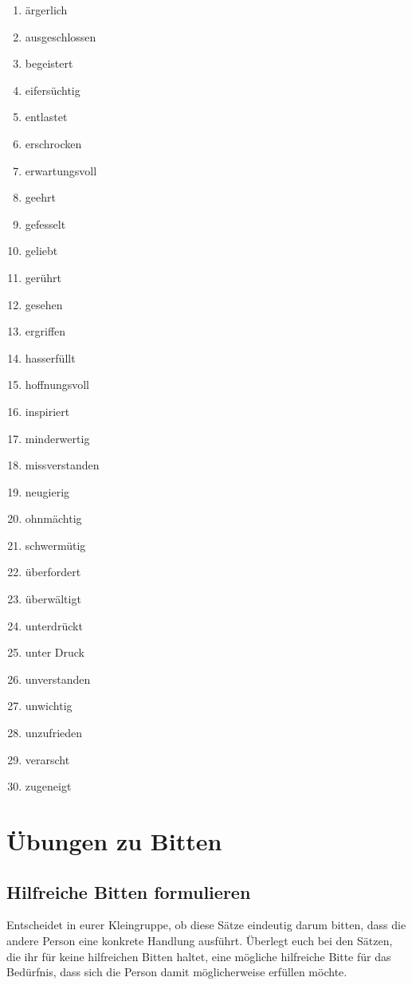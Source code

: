 \begin{enumerate}
    \item ärgerlich
    \item ausgeschlossen
    \item begeistert
    \item eifersüchtig
    \item entlastet
    \item erschrocken
    \item erwartungsvoll
    \item geehrt
    \item gefesselt
    \item geliebt
    \item gerührt
    \item gesehen
    \item ergriffen
    \item hasserfüllt
    \item hoffnungsvoll
    \item inspiriert
    \item minderwertig
    \item missverstanden
    \item neugierig
    \item ohnmächtig
    \item schwermütig
    \item überfordert
    \item überwältigt
    \item unterdrückt
    \item unter Druck
    \item unverstanden
    \item unwichtig
    \item unzufrieden
    \item verarscht
    \item zugeneigt
\end{enumerate}


\section{Übungen zu Bitten}

\subsection{Hilfreiche Bitten formulieren}

Entscheidet in eurer Kleingruppe, ob diese Sätze eindeutig darum bitten, dass die andere Person eine konkrete Handlung ausführt. Überlegt euch bei den Sätzen, die ihr für keine hilfreichen Bitten haltet, eine mögliche hilfreiche Bitte für das Bedürfnis, dass sich die Person damit möglicherweise erfüllen möchte.

